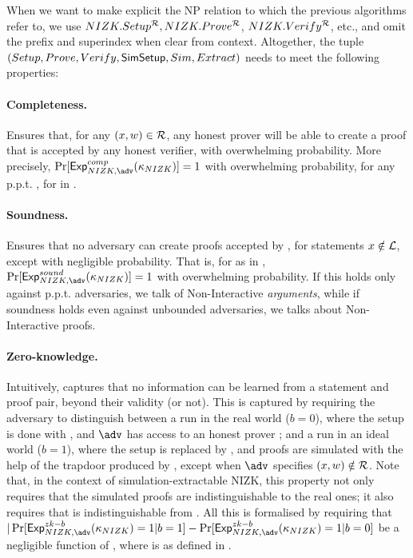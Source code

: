 When we want to make explicit the NP relation \NIZKRel to which the previous
algorithms refer to, we use $NIZK.Setup^\mathcal{R},NIZK.Prove^\mathcal{R}$, 
$NIZK.Verify^\mathcal{R}$, etc., and omit the \NIZK prefix and superindex when
clear from context. Altogether, the tuple $(Setup,Prove,Verify,\mathsf{SimSetup},
Sim,Extract)$ needs to meet the following properties:

\paragraph{Completeness.} %
Ensures that, for any $(x,w) \in \mathcal{R}$, any honest prover will be
able to create a proof \NIZKproof that is accepted by any honest verifier, with
overwhelming probability. More precisely, $\Pr\lbrack\ExpNIZKComp(\NIZKsecpar)
\rbrack = 1$ with overwhelming probability, for any p.p.t. \adv, for
\ExpNIZKComp in .

\paragraph{Soundness.} %
Ensures that no adversary can create proofs accepted by \Verify, for
statements $x \notin \mathcal{L}$, except with negligible probability. That
is, for \ExpNIZKSound as in , $\Pr\lbrack\ExpNIZKSound
(\NIZKsecpar)\rbrack=1$ with overwhelming probability. If this holds only
against p.p.t. adversaries, we talk of Non-Interactive \emph{arguments}, while
if soundness holds even against unbounded adversaries, we talks about
Non-Interactive proofs.

\paragraph{Zero-knowledge.} %
Intuitively, captures that no information can be learned from a statement and
proof pair, beyond their validity (or not). This is captured by requiring the
adversary to distinguish between a run in the real world ($b=0$), where the
setup is done with \Setup, and $\adv$ has access to an honest prover
\Prove; and a run in an ideal world ($b=1$), where the setup is replaced by
\SimSetup, and proofs are simulated with the help of the trapdoor produced by
\SimSetup, except when $\adv$ specifies $(x,w) \notin \mathcal{R}$. Note
that, in the context of simulation-extractable NIZK, this property not only
requires that the simulated proofs are indistinguishable to the real ones; it
also requires that \SimSetup is indistinguishable from \Setup. All this is
formalised by requiring that $|\Pr[\ExpNIZKZKb(\NIZKsecpar) = 1 | b = 1] -
\Pr[\ExpNIZKZKb(\NIZKsecpar) = 1 | b = 0]$ be a negligible function of \secpar,
where \ExpNIZKZKb is as defined in .

